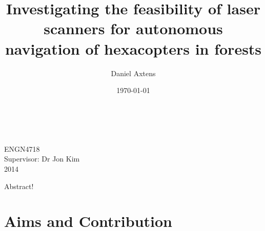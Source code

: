 \documentclass[12pt,oneside,a4paper]{book}
\title{Investigating the feasibility of laser scanners for autonomous
  navigation of hexacopters in forests}
\author{Daniel Axtens}
\date{\today}
\begin{document}
\pagestyle{empty}
\thispagestyle{empty}

\begin{titlepage}
  \enlargethispage{2cm}
  \begin{center}
    \makeatletter
    \Huge\textbf{\@title} \\[2.9cm]
    \huge\textbf{\@author} \\[10.5cm]
    \makeatother
    \LARGE ENGN4718\\
    Supervisor: Dr Jon Kim\\[2cm]
    2014
  \end{center}
\end{titlepage}


%

%

%

\cleardoublepage
\pagestyle{headings}
%
Abstract!
\cleardoublepage
\pagestyle{headings}
\tableofcontents

\mainmatter

\chapter{Aims and Contribution}
\label{cha:aims}

\end{document}
